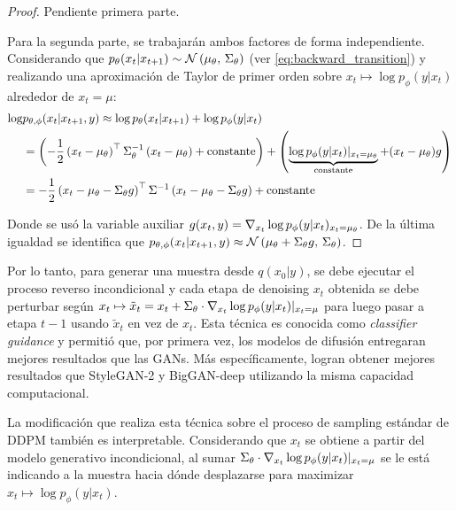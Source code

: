 \begin{proof}
    Pendiente primera parte.

    Para la segunda parte, se trabajarán ambos factores de forma independiente. Considerando que $p_\theta(x_t|x_{t+1})\sim\mathcal{N}\left(\mu_\theta,\,\Sigma_\theta\right)$ (ver \eqref{eq:backward_transition}) y realizando una aproximación de Taylor de primer orden sobre $x_t\mapsto \log p_\phi(y|x_t)$ alrededor de $x_t=\mu$:
    \begin{align}
        \log & p_{\theta,\phi}(x_t|x_{t+1},y) \approx \log p_\theta(x_t|x_{t+1}) + \log p_\phi(y|x_t)                                                                                                          \\
             & = \left(-\frac{1}{2}\left(x_t-\mu_\theta\right)^\top \Sigma_\theta^{-1}\left(x_t-\mu_\theta\right) + \operatorname{constante}\right) + \left(\underbrace{\log p_\phi(y|x_t)|_{x_t=\mu_\theta}}_{\operatorname{constante}}  +  (x_t-\mu_\theta) g\right) \\
             & = -\frac{1}{2} \left(x_t-\mu_\theta-\Sigma_\theta g\right)^\top \Sigma^{-1} \left(x_t-\mu_\theta-\Sigma_\theta g\right) + \operatorname{constante}
    \end{align}

    Donde se usó la variable auxiliar $g(x_t,y) = \nabla_{x_t} \log p_\phi(y|x_t)_{x_t=\mu_\theta}$. De la última igualdad se identifica que $p_{\theta,\phi}(x_t|x_{t+1},y) \approx\mathcal{N}\left(\mu_\theta + \Sigma_\theta g,\,\Sigma_\theta\right)$.
\end{proof}

Por lo tanto, para generar una muestra desde $q(x_0|y)$, se debe ejecutar el proceso reverso incondicional y cada etapa de denoising $x_t$ obtenida se debe perturbar según $x_t\mapsto \tilde x_t = x_t + \Sigma_\theta \cdot \nabla_{x_t} \log p_\phi(y|x_t)|_{x_t=\mu}$ para luego pasar a etapa $t-1$ usando $\tilde x_t$ en vez de $x_t$. Esta técnica es conocida como \textit{classifier guidance} y permitió que, por primera vez, los modelos de difusión entregaran mejores resultados que las GANs. Más específicamente, logran obtener mejores resultados que StyleGAN-2 y BigGAN-deep utilizando la misma capacidad computacional.

La modificación que realiza esta técnica sobre el proceso de sampling estándar de DDPM también es interpretable. Considerando que $x_t$ se obtiene a partir del modelo generativo incondicional, al sumar $\Sigma_\theta \cdot \nabla_{x_t} \log p_\phi(y|x_t)|_{x_t=\mu}$ se le está indicando a la muestra hacia dónde desplazarse para maximizar $x_t\mapsto \log p_\phi(y|x_t)$.

